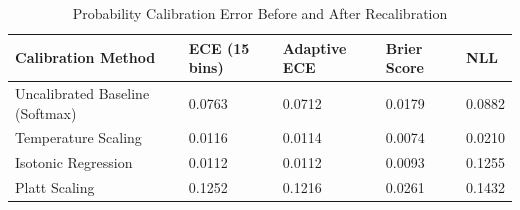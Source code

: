 \begin{table}
\caption{Probability Calibration Error Before and After Recalibration}
\label{tab:calibration}
\begin{tabular}{lllll}
\toprule
Calibration Method & ECE (15 bins) & Adaptive ECE & Brier Score & NLL \\
\midrule
Uncalibrated Baseline (Softmax) & 0.0763 & 0.0712 & 0.0179 & 0.0882 \\
Temperature Scaling & 0.0116 & 0.0114 & 0.0074 & 0.0210 \\
Isotonic Regression & 0.0112 & 0.0112 & 0.0093 & 0.1255 \\
Platt Scaling & 0.1252 & 0.1216 & 0.0261 & 0.1432 \\
\bottomrule
\end{tabular}
\end{table}

